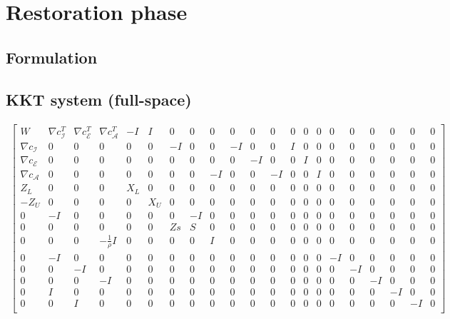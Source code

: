 \documentclass[10pt]{article}
\begin{document}
	\newpage
	\section*{Restoration phase}
	\subsection*{Formulation}
	\subsection*{KKT system (full-space)}
		\begin{equation}
		\begin{aligned}
		\begin{bmatrix}
			W & \nabla c_{\mathcal I}^T & \nabla c_{\mathcal E}^T & \nabla c_{\mathcal A}^T & -I & I & 0 & 0 & 0 & 0 & 0 & 0 & 0 & 0 & 0 & 0 & 0 & 0 & 0 & 0 & 0\\
			\nabla c_{\mathcal I} & 0 & 0 & 0 & 0 & 0 & -I & 0 & 0 & -I & 0 & 0 & I & 0 & 0 & 0 & 0 & 0 & 0 & 0 & 0\\
			\nabla c_{\mathcal E} & 0 & 0 & 0 & 0 & 0 & 0 & 0 & 0 & 0 & -I & 0 & 0 & I & 0 & 0 & 0 & 0 & 0 & 0 & 0\\
			\nabla c_{\mathcal A} & 0 & 0 & 0 & 0 & 0 & 0 & 0 & -I & 0 & 0 & -I & 0 & 0 & I & 0 & 0 & 0 & 0 & 0 & 0\\
			Z_L & 0 & 0 & 0 & X_L & 0 & 0 & 0 & 0 & 0 & 0 & 0 & 0 & 0 & 0 & 0 & 0 & 0 & 0 & 0 & 0\\
			-Z_U & 0 & 0 & 0 & 0 & X_U & 0 & 0 & 0 & 0 & 0 & 0 & 0 & 0 & 0 & 0 & 0 & 0 & 0 & 0 & 0\\
			0 & -I & 0 & 0 & 0 & 0 & 0 & -I & 0 & 0 & 0 & 0 & 0 & 0 & 0 & 0 & 0 & 0 & 0 & 0 & 0\\
			0 & 0 & 0 & 0 & 0 & 0 & Zs & S & 0 & 0 & 0 & 0 & 0 & 0 & 0 & 0 & 0 & 0 & 0 & 0 & 0\\
			0 & 0 & 0 & -\frac{1}{\rho}I & 0 & 0 & 0 & 0 & I & 0 & 0 & 0 & 0 & 0 & 0 & 0 & 0 & 0 & 0 & 0 & 0\\
			0 & -I & 0 & 0 & 0 & 0 & 0 & 0 & 0 & 0 & 0 & 0 & 0 & 0 & 0 & -I & 0 & 0 & 0 & 0 & 0\\
			0 & 0 & -I & 0 & 0 & 0 & 0 & 0 & 0 & 0 & 0 & 0 & 0 & 0 & 0 & 0 & -I & 0 & 0 & 0 & 0\\
			0 & 0 & 0 & -I & 0 & 0 & 0 & 0 & 0 & 0 & 0 & 0 & 0 & 0 & 0 & 0 & 0 & -I & 0 & 0 & 0\\
			0 & I & 0 & 0 & 0 & 0 & 0 & 0 & 0 & 0 & 0 & 0 & 0 & 0 & 0 & 0 & 0 & 0 & -I & 0 & 0\\
			0 & 0 & I & 0 & 0 & 0 & 0 & 0 & 0 & 0 & 0 & 0 & 0 & 0 & 0 & 0 & 0 & 0 & 0 & -I & 0\\

\end{bmatrix}
\end{aligned}
\end{equation}
\end{document}
